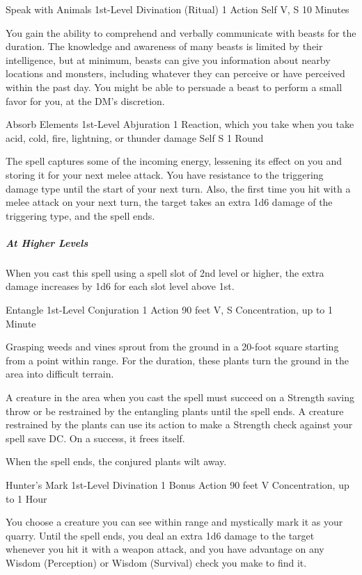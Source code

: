 {\DndSpellHeader
  {Speak with Animals}
  {1st-Level Divination (Ritual)}
  {1 Action}
  {Self}
  {V, S}
  {10 Minutes}

You gain the ability to comprehend and verbally communicate with beasts for the duration. The knowledge and awareness of many beasts is limited by their intelligence, but at minimum, beasts can give you information about nearby locations and monsters, including whatever they can perceive or have perceived within the past day. You might be able to persuade a beast to perform a small favor for you, at the DM’s discretion.

\DndSpellHeader
  {Absorb Elements}
  {1st-Level Abjuration}
  {1 Reaction, which you take when you take acid, cold, fire, lightning, or thunder damage}
  {Self}
  {S}
  {1 Round}

The spell captures some of the incoming energy, lessening its effect on you and storing it for your next melee attack. You have resistance to the triggering damage type until the start of your next turn. Also, the first time you hit with a melee attack on your next turn, the target takes an extra 1d6 damage of the triggering type, and the spell ends.

\subparagraph*{At Higher Levels} When you cast this spell using a spell slot of 2nd level or higher, the extra damage increases by 1d6 for each slot level above 1st.

\DndSpellHeader
  {Entangle}
  {1st-Level Conjuration}
  {1 Action}
  {90 feet}
  {V, S}
  {Concentration, up to 1 Minute}

Grasping weeds and vines sprout from the ground in a 20-foot square starting from a point within range. For the duration, these plants turn the ground in the area into difficult terrain.

A creature in the area when you cast the spell must succeed on a Strength saving throw or be restrained by the entangling plants until the spell ends. A creature restrained by the plants can use its action to make a Strength check against your spell save DC. On a success, it frees itself.

When the spell ends, the conjured plants wilt away.

\DndSpellHeader
  {Hunter's Mark}
  {1st-Level Divination}
  {1 Bonus Action}
  {90 feet}
  {V}
  {Concentration, up to 1 Hour}

You choose a creature you can see within range and mystically mark it as your quarry. Until the spell ends, you deal an extra 1d6 damage to the target whenever you hit it with a weapon attack, and you have advantage on any Wisdom (Perception) or Wisdom (Survival) check you make to find it.

}
